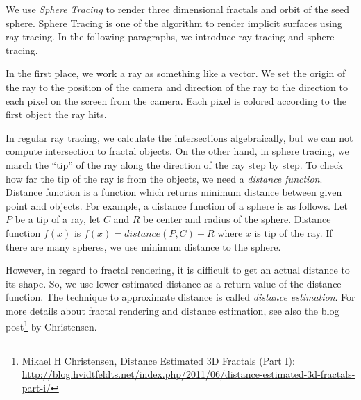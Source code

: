 We use \textit{Sphere Tracing} \cite{hart1996sphere} to render three dimensional
fractals and orbit of the seed sphere.
Sphere Tracing is one of the algorithm to render implicit surfaces using
ray tracing.
In the following paragraphs, we introduce ray tracing and
 sphere tracing.

In the first place, we work a ray as something like a vector.
We set the origin of the ray to the position of the camera
and direction of the ray to the direction to each pixel on the screen
from the camera. Each pixel is colored according to the
first object the ray hits. 

In regular ray tracing, we calculate the intersections algebraically, but
we can not compute intersection to fractal objects.
On the other hand, in sphere tracing, we march the ``tip'' of the ray
along the direction of the ray step by step. 
To check how far the tip of the ray is from the objects, we need a
\textit{distance function}.
Distance function is a function which returns minimum distance between
given point and objects.
For example, a distance function of a sphere is as follows.
Let $P$ be a tip of a ray, let $C$ and $R$ be center and
radius of the sphere.
Distance function $f(x)$ is $f(x) = distance(P, C) - R$ where $x$ is tip
of the ray.
If there are many spheres, we use minimum distance to the sphere.

However, in regard to fractal rendering, it is difficult to
get an actual distance to its shape. So, we use lower estimated distance
as a return value of the distance function. The technique to approximate
distance is called \textit{distance estimation}.
For more details about fractal rendering and distance estimation, see also the blog
post\footnote{Mikael H Christensen, Distance Estimated 3D Fractals (Part I):\\ \quad\quad
\url{http://blog.hvidtfeldts.net/index.php/2011/06/distance-estimated-3d-fractals-part-i/}}
by Christensen. 

